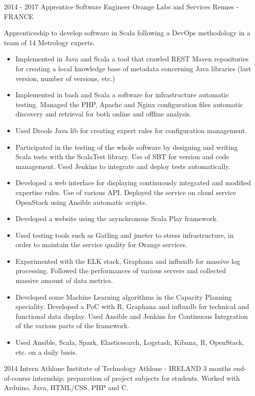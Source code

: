 \documentclass[11pt,a4paper,sans]{moderncv}        %
\begin{document}
\cventry
	{2014 - 2017}
	{Apprentice Software Engineer}
	{Orange Labs and Services}
	{Rennes - FRANCE}
	{}
	{Apprenticeship to develop software in Scala following a DevOps methodology in a team of 14 Metrology experts. 
	\begin{itemize}
	\item Implemented in Java and Scala a tool that crawled REST Maven repositories for creating a local knowledge base of metadata concerning Java libraries (last version, number of versions, etc.)
    \item Implemented in bash and Scala a software for infrastructure automatic testing. Managed the PHP, Apache and Nginx configuration files automatic discovery and retrieval for both online and offline analysis.
    \item Used Drools Java lib for creating expert rules for configuration management.
  	\item Participated in the testing of the whole software by designing and writing Scala tests with the ScalaTest library. Use of SBT for version and code management. Used Jenkins to integrate and deploy tests automatically.
    \item Developed a web interface for displaying continuously integrated and modified expertise rules. Use of various API. Deployed the service on cloud service OpenStack using Ansible automatic scripts.
    \item Developed a website using the asynchronous Scala Play framework.
    \item Used testing tools such as Gatling and jmeter to stress infrastructure, in order to maintain the service quality for Orange services.    
    \item Experimented with the ELK stack, Graphana and influxdb for massive log processing. Followed the performances of various servers and collected massive amount of data metrics.
    \item Developed some Machine Learning algorithms in the Capacity Planning speciality. Developed a PoC with R, Graphana and influxdb for technical and functional data display. Used Ansible and Jenkins for Continuous Integration of the various parts of the framework.
	\item Used Ansible, Scala, Spark, Elasticsearch, Logstash, Kibana, R, OpenStack, etc. on a daily basis.	
	\end{itemize}
}

\cventry
    {2014}
    {Intern}
    {Athlone Institute of Technology}
    {Athlone - IRELAND}
    {}
    {3 months end-of-course internship; preparation of project subjects for students. Worked with {Arduino}, {Java}, {HTML/CSS}, PHP and {C}.}
    
\end{document}
